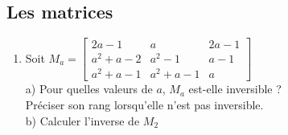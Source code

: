 \documentclass{article}
\begin{document}
\begin{giacjshere}
\subsection{Les matrices}
\begin{enumerate}
\item Soit $M_a=\left[ 
\begin{array}{ccc}
2a-1 & a & 2a-1\\
a^2+a-2 & a^2-1 & a-1\\
a^2+a-1 & a^2+a-1 & a
\end{array}
\right]$\\
a) Pour quelles valeurs de $a$, $M_a$ est-elle inversible ?\\
Pr\'eciser son rang lorsqu'elle n'est pas inversible.\\
b) Calculer l'inverse de $M_2$


\end{enumerate}
\end{giacjshere}
\end{document}

